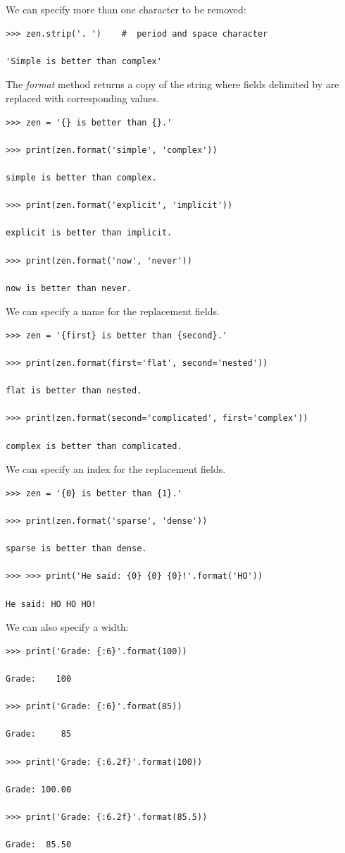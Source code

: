 \documentclass{article}
\begin{document}
We can specify more than one character to be removed:

\begin{lstlisting}
>>> zen.strip('. ')    #  period and space character

'Simple is better than complex'
\end{lstlisting}

The \textit{format} method returns a copy of the string where fields delimited by {} are replaced with corresponding values.

\begin{lstlisting}
>>> zen = '{} is better than {}.'

>>> print(zen.format('simple', 'complex'))

simple is better than complex.

>>> print(zen.format('explicit', 'implicit'))

explicit is better than implicit.

>>> print(zen.format('now', 'never'))

now is better than never.
\end{lstlisting}

We can specify a name for the replacement fields.

\begin{lstlisting}
>>> zen = '{first} is better than {second}.'

>>> print(zen.format(first='flat', second='nested'))

flat is better than nested.

>>> print(zen.format(second='complicated', first='complex'))

complex is better than complicated.
\end{lstlisting}

We can specify an index for the replacement fields.

\begin{lstlisting}
>>> zen = '{0} is better than {1}.'

>>> print(zen.format('sparse', 'dense'))

sparse is better than dense.

>>> >>> print('He said: {0} {0} {0}!'.format('HO'))

He said: HO HO HO!
\end{lstlisting}

We can also specify a width:

\begin{lstlisting}
>>> print('Grade: {:6}'.format(100))

Grade:    100

>>> print('Grade: {:6}'.format(85))

Grade:     85

>>> print('Grade: {:6.2f}'.format(100))

Grade: 100.00

>>> print('Grade: {:6.2f}'.format(85.5))

Grade:  85.50
\end{lstlisting}
\end{document}

